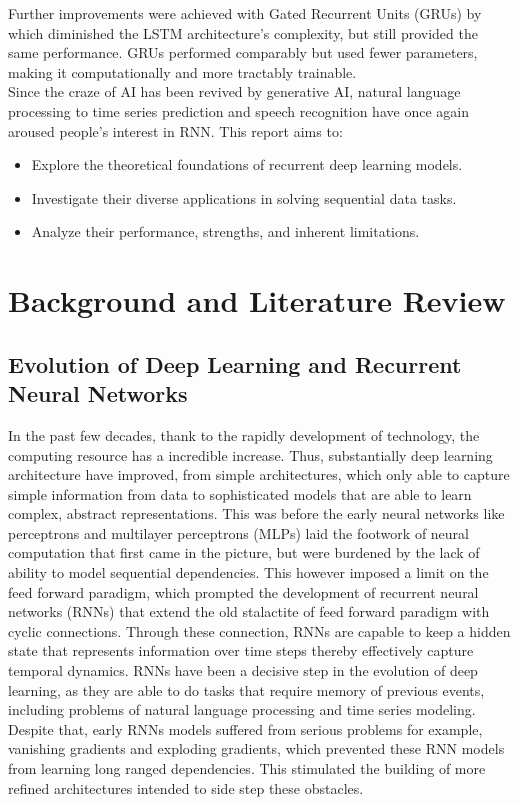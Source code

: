 \documentclass[12pt,a4paper]{article}
\begin{document}
Further improvements were achieved with Gated Recurrent Units (GRUs) by \parencite{cho2014properties} which diminished the LSTM architecture's complexity, but still provided the same performance. GRUs performed comparably but used fewer parameters, making it computationally and more tractably trainable.\\[1ex]
Since the craze of AI has been revived by generative AI, natural language processing to time series prediction and speech recognition have once again aroused people's interest in RNN. This report aims to:
\begin{itemize}
    \item Explore the theoretical foundations of recurrent deep learning models.
    \item Investigate their diverse applications in solving sequential data tasks.
    \item Analyze their performance, strengths, and inherent limitations.
\end{itemize}

\section{Background and Literature Review}
\subsection{Evolution of Deep Learning and Recurrent Neural Networks}
In the past few decades, thank to the rapidly development of technology, the computing resource has a incredible increase. Thus, substantially deep learning architecture have improved, from simple architectures, which only able to capture simple information from data to sophisticated models that are able to learn complex, abstract representations. This was before the early neural networks like perceptrons and multilayer perceptrons (MLPs) laid the footwork of neural computation that first came in the picture, but were burdened by the lack of ability to model sequential dependencies. This however imposed a limit on the feed forward paradigm, which prompted the development of recurrent neural networks (RNNs) that extend the old stalactite of feed forward paradigm with cyclic connections. Through these connection, RNNs are capable to keep a hidden state that represents information over time steps thereby effectively capture temporal dynamics. RNNs have been a decisive step in the evolution of deep learning, as they are able to do tasks that require memory of previous events, including problems of natural language processing and time series modeling. Despite that, early RNNs models suffered from serious problems for example,  vanishing gradients and exploding gradients, which prevented these RNN models from learning long ranged dependencies. This stimulated the building of more refined architectures intended to side step these obstacles.
\end{document}
